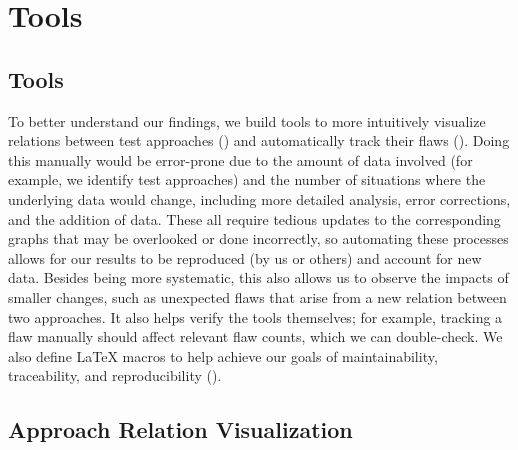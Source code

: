 \ifnotpaper\section{Tools}
\else\subsection{Tools}
\fi\label{tools}

\ifnotpaper
    To better understand our findings, we build tools to more intuitively
    visualize relations between test approaches () and
    automatically track their flaws (). Doing
    this manually would be error-prone due to the amount of data involved (for
    example, we identify \approachCount{} test approaches) and the number of
    situations where the underlying data would change, including more detailed
    analysis, error corrections, and the addition of data. These all require
    tedious updates to the corresponding graphs that may be overlooked or done
    incorrectly, so automating these processes allows for our results to be
    reproduced (by us or others) and account for new data. Besides being more
    systematic, this also allows us to observe the impacts of smaller changes,
    such as unexpected flaws that arise from a new relation between two
    approaches. It also helps verify the tools themselves; for example,
    tracking a flaw manually should affect relevant flaw counts, which we can
    double-check. We also define \LaTeX{} macros to help achieve our goals of
    maintainability, traceability, and reproducibility ().

    \subsection{Approach Relation Visualization}\label{app-rel-vis}
\fi


